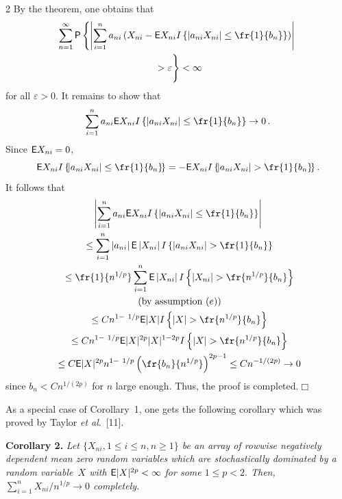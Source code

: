 \begin{multicols}{2}
By the theorem, one obtains that
\begin{multline*}
\hspace*{-1.55515pt}\sum\limits_{n=1}^\infty {\sf P}\left\{
\left\vert \sum\limits_{i=1}^n a_{ni}\left(X_{ni}- 
{\sf E}X_{ni}I\left\{\left\vert a_{ni}X_{ni}\right\vert \le \fr{1}{b_n}\right\}\right)
\right\vert\right.\\ 
\left.{}>\varepsilon 
\vphantom{\sum\limits_{i=1}^n}\right\}
<\infty
\end{multline*}
for all $\varepsilon>0$.
It remains to show that
$$ 
\sum\limits_{i=1}^n a_{ni}{\sf E}X_{ni}I\left\{|a_{ni}X_{ni}|\le \fr{1}{b_n}\right\}\to 0\,. 
$$
Since ${\sf E}X_{ni}=0$,
$$
{\sf E}X_{ni}I\left\{\!|a_{ni}X_{ni}|\le \fr{1}{b_n}\!\right\}=
-{\sf E}X_{ni}I\left\{\!|a_{ni}X_{ni}|>\fr{1}{b_n}\!\right \}.
$$
It follows that
\begin{multline*}
\left\vert\sum\limits_{i=1}^n a_{ni}{\sf E}X_{ni}I
\left\{\left\vert a_{ni}X_{ni}\right\vert \le \fr{1}{b_n}\right\}\right\vert\\
{}\le\sum\limits_{i=1}^n \left\vert a_{ni}\right\vert {\sf E} \left\vert X_{ni}\right\vert
I\left\{\left\vert a_{ni}X_{ni}\right\vert > \fr{1}{b_n}\right\}\\
{}\le \fr{1}{n^{1/p}} \sum\limits_{i=1}^n {\sf E}\left\vert X_{ni}\right\vert
I\left\{\left\vert X_{ni}\right\vert>\fr{n^{1/p}}{b_n}\right\}\\
\mbox{ (by assumption ($e$))} \\
{}\le C n^{1 - \ 1/p} {\sf E}|X|I\left\{|X|>\fr{n^{1/p}}{b_n}\right\}\\
{}\le C n^{1 - \ 1/p} {\sf E}|X|^{2p} |X|^{1-2p} I\left\{|X|>\fr{n^{1/p}}{b_n}\right\} \\
{}\le C {\sf E}|X|^{2p} n^{1 - \ 1/p}\left(\fr{b_n}{n^{1/p}}\right)^{2p-1} \le C n^{-1/(2p)}\to 0
\end{multline*}
since $b_n<Cn^{1/(2p)}$ for $n$ large enough. Thus, the proof is completed.\hfill $\Box$

\medskip
As a special case of Corollary~1, one gets the following corollary which was proved by 
Taylor \textit{et al}.~[11].

\medskip

\noindent 
\textbf{Corollary 2.} \textit{Let $\{X_{ni}, 1\le i \le n, n\ge 1\}$ be an array of rowwise negatively dependent
mean zero random variables which are stochastically dominated by a random variable~$X$ with 
${\sf E}|X|^{2p}<\infty$
for some $1\le p<2.$ Then,
$\sum\limits_{i=1}^n {X_{ni}}/{n^{1/p}} \to 0$ completely.} 



\end{multicols}
